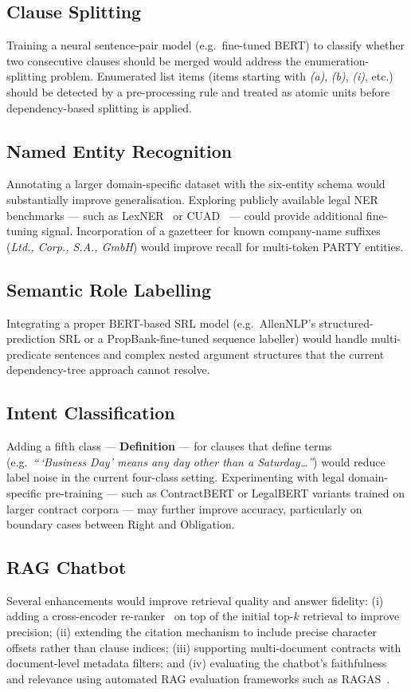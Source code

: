 \documentclass[12pt,a4paper]{report}
\begin{document}
\subsection*{Clause Splitting}
Training a neural sentence-pair model (e.g.\ fine-tuned BERT) to classify whether
two consecutive clauses should be merged would address the enumeration-splitting
problem.  Enumerated list items (items starting with \textit{(a)}, \textit{(b)},
\textit{(i)}, etc.) should be detected by a pre-processing rule and treated as
atomic units before dependency-based splitting is applied.

\subsection*{Named Entity Recognition}
Annotating a larger domain-specific dataset with the six-entity schema would
substantially improve generalisation.  Exploring publicly available legal NER
benchmarks --- such as LexNER~\cite{luz2021lextreme} or CUAD~\cite{hendrycks2021cuad}
--- could provide additional fine-tuning signal.  Incorporation of a gazetteer for
known company-name suffixes (\textit{Ltd., Corp., S.A., GmbH}) would improve
recall for multi-token PARTY entities.

\subsection*{Semantic Role Labelling}
Integrating a proper BERT-based SRL model (e.g.\ AllenNLP's structured-prediction
SRL or a PropBank-fine-tuned sequence labeller) would handle multi-predicate
sentences and complex nested argument structures that the current dependency-tree
approach cannot resolve.

\subsection*{Intent Classification}
Adding a fifth class --- \textbf{Definition} --- for clauses that define terms
(e.g.\ \textit{``\,`Business Day' means any day other than a Saturday\ldots''})
would reduce label noise in the current four-class setting.  Experimenting with
legal domain-specific pre-training --- such as ContractBERT or LegalBERT variants
trained on larger contract corpora --- may further improve accuracy, particularly
on boundary cases between Right and Obligation.

\subsection*{RAG Chatbot}
Several enhancements would improve retrieval quality and answer fidelity: (i)
adding a cross-encoder re-ranker~\cite{nogueira2019passage} on top of the initial
top-$k$ retrieval to improve precision; (ii) extending the citation mechanism to
include precise character offsets rather than clause indices; (iii) supporting
multi-document contracts with document-level metadata filters; and (iv) evaluating
the chatbot's faithfulness and relevance using automated RAG evaluation frameworks
such as RAGAS~\cite{es2024ragas}.
\end{document}
